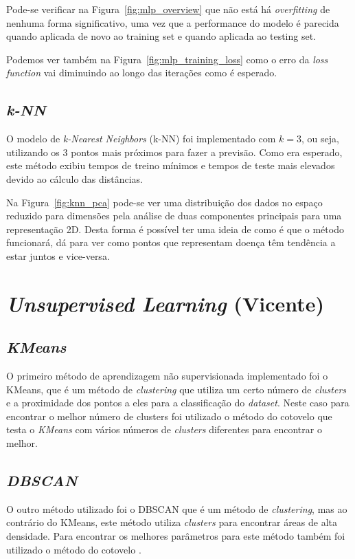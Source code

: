 Pode-se verificar na Figura~\ref{fig:mlp_overview} que não está há \textit{overfitting} de nenhuma forma significativo, uma vez que a performance do modelo é parecida quando aplicada de novo ao training set e quando aplicada ao testing set.

Podemos ver também na Figura~\ref{fig:mlp_training_loss} como o erro da \textit{loss function} vai diminuindo ao longo das iterações como é esperado.



\subsection{\textit{k-NN}}
\label{chap4:k-nn}

O modelo de \textit{k-Nearest Neighbors} (k-NN) foi implementado com \(k=3\), ou seja, utilizando os 3 pontos mais próximos para fazer a previsão. Como era esperado, este método exibiu tempos de treino mínimos e tempos de teste mais elevados devido ao cálculo das distâncias. 

Na Figura~\ref{fig:knn_pca} pode-se ver uma distribuição dos dados no espaço reduzido para dimensões pela análise de duas componentes principais para uma representação 2D. Desta forma é possível ter uma ideia de como é que o método funcionará, dá para ver como pontos que representam doença têm tendência a estar juntos e vice-versa.








\section{\textit{Unsupervised Learning} (Vicente)}
\label{chap4:unsuper}

\subsection{\textit{KMeans}}
\label{chap4:kmenas}

O primeiro método de aprendizagem não supervisionada implementado foi o KMeans, que é um método de \textit{clustering} que utiliza um certo número de \textit{clusters} e a proximidade dos pontos a eles para a classificação do \textit{dataset}. Neste caso para encontrar o melhor número de clusters foi utilizado o método do cotovelo \cite{cotovelo_kmeans} que testa o \textit{KMeans} com vários números de \textit{clusters} diferentes para encontrar o melhor.

\subsection{\textit{DBSCAN}}
\label{chap4:dbscan}

O outro método utilizado foi o DBSCAN que é um método de \textit{clustering}, mas ao contrário do KMeans, este método utiliza \textit{clusters} para encontrar áreas de alta densidade. Para encontrar os melhores parâmetros para este método também foi utilizado o método do cotovelo \cite{cotovelo_dbscan}.